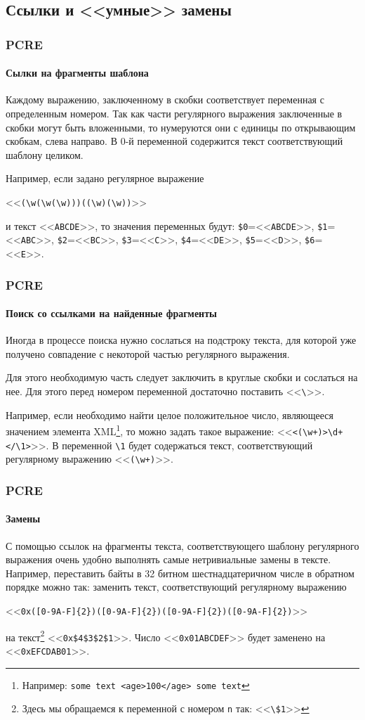 \subsection{Ссылки и <<умные>> замены}

\begin{frame}[fragile]
    \frametitle{PCRE}
    \framesubtitle{Сылки на фрагменты шаблона}
    
    Каждому выражению, заключенному в скобки соответствует переменная с определенным номером. Так как части регулярного выражения заключенные в скобки могут быть вложенными, то нумеруются они с единицы по открывающим скобкам, слева направо. В 0-й переменной содержится текст соответствующий шаблону целиком.
    
    Например, если задано регулярное выражение 
    \begin{center}
        <<\verb"(\w(\w(\w)))((\w)(\w))">>
    \end{center}
    и текст <<\verb"ABCDE">>, то значения переменных будут: \verb"$0"=<<\verb"ABCDE">>, \verb"$1"=<<\verb"ABC">>, \verb"$2"=<<\verb"BC">>, \verb"$3"=<<\verb"C">>, \verb"$4"=<<\verb"DE">>, \verb"$5"=<<\verb"D">>, \verb"$6"=<<\verb"E">>. 
\end{frame}

\begin{frame}[fragile]
    \frametitle{PCRE}
    \framesubtitle{Поиск со ссылками на найденные фрагменты}
    
    Иногда в процессе поиска нужно сослаться на подстроку текста, для которой уже получено совпадение с некоторой частью регулярного выражения. 
    
    Для этого необходимую часть следует заключить в круглые скобки и сослаться на нее. Для этого перед номером переменной достаточно поставить <<\verb"\">>. 
    
    Например, если необходимо найти целое положительное число, являющееся значением элемента XML\footnote{Например: \verb"some text <age>100</age> some text"}, то можно задать такое выражение: <<\verb"<(\w+)>\d+</\1>">>. В переменной \verb"\1" будет содержаться текст, соответствующий регулярному выражению <<\verb"(\w+)">>.    
\end{frame}

\begin{frame}[fragile]
    \frametitle{PCRE}
    \framesubtitle{Замены}
    
    С помощью ссылок на фрагменты текста, соответствующего шаблону регулярного выражения очень удобно выполнять самые нетривиальные замены в тексте. Например, переставить байты в 32 битном шестнадцатеричном числе в обратном порядке можно так: заменить текст, соответствующий регулярному выражению 
    \begin{center}
        <<\verb"0x([0-9A-F]{2})([0-9A-F]{2})([0-9A-F]{2})([0-9A-F]{2})">>
    \end{center}
    на текст\footnote{Здесь мы обращаемся к переменной с номером \verb"n" так: <<\verb"\$1">>} <<\verb"0x$4$3$2$1">>. Число <<\verb"0x01ABCDEF">> будет заменено на <<\verb"0xEFCDAB01">>.
\end{frame}
    
